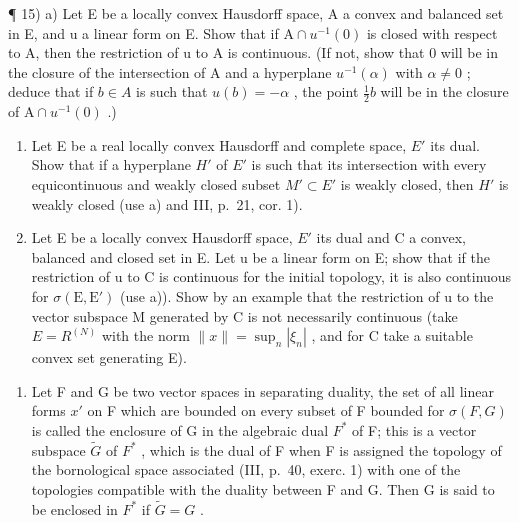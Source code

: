 ¶ 15) a) Let E be a locally convex Hausdorff space, A a convex and balanced set in E, and u a linear form on E. Show that if \(\mathrm{A} \cap u^{-1}(0)\) is closed with respect to A, then the restriction of u to A is continuous. (If not, show that 0 will be in the closure of the intersection of A and a hyperplane \(u^{-1}(\alpha)\) with \(\alpha \neq 0\) ; deduce that if \(b \in A\) is such that \(u(b) = -\alpha\) , the point \(\frac{1}{2}b\) will be in the closure of \(\mathrm{A} \cap u^{-1}(0)\) .)

\begin{enumerate}
\def\labelenumi{\alph{enumi})}
\setcounter{enumi}{1}
\item
  Let E be a real locally convex Hausdorff and complete space, \(E'\) its dual. Show that if a hyperplane \(H'\) of \(E'\) is such that its intersection with every equicontinuous and weakly closed subset \(M' \subset E'\) is weakly closed, then \(H'\) is weakly closed (use a) and III, p.~21, cor. 1).
\item
  Let E be a locally convex Hausdorff space, \(E'\) its dual and C a convex, balanced and closed set in E. Let u be a linear form on E; show that if the restriction of u to C is continuous for the initial topology, it is also continuous for \(\sigma(\mathrm{E}, \mathrm{E}')\) (use a)). Show by an example that the restriction of u to the vector subspace M generated by C is not necessarily continuous (take \(E = R^{(N)}\) with the norm \(\|x\| = \sup_{n} |\xi_{n}|\) , and for C take a suitable convex set generating E).
\end{enumerate}

\begin{enumerate}
\def\labelenumi{\arabic{enumi})}
\setcounter{enumi}{15}
\tightlist
\item
  Let F and G be two vector spaces in separating duality, the set of all linear forms \(x'\) on F which are bounded on every subset of F bounded for \(\sigma(F, G)\) is called the enclosure of G in the algebraic dual \(F^{*}\) of F; this is a vector subspace \(\tilde{G}\) of \(F^{*}\) , which is the dual of F when F is assigned the topology of the bornological space associated (III, p.~40, exerc. 1) with one of the topologies compatible with the duality between F and G. Then G is said to be enclosed in \(F^{*}\) if \(\tilde{G} = G\) .
\end{enumerate}

